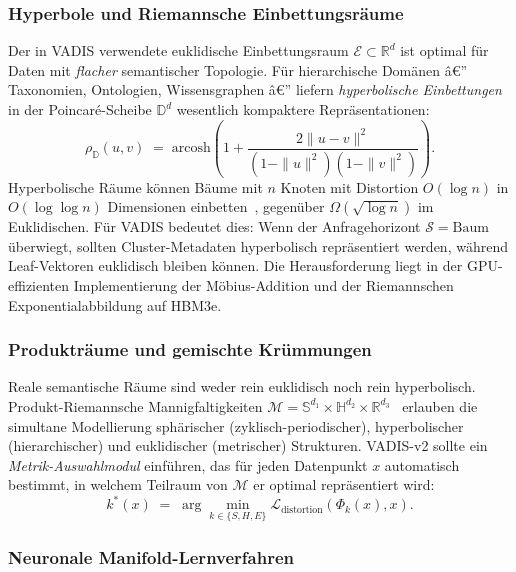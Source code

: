 ﻿\documentclass[12pt,a4paper]{article}
\begin{document}
\subsubsection{Hyperbole und Riemannsche Einbettungsräume}

Der in VADIS verwendete euklidische Einbettungsraum
$\mathcal{E} \subset \mathbb{R}^d$ ist optimal für
Daten mit \emph{flacher} semantischer Topologie. Für
hierarchische Domänen â€” Taxonomien, Ontologien, Wissensgraphen
â€” liefern \emph{hyperbolische Einbettungen}~\cite{nickel2017poincare}
in der Poincaré-Scheibe $\mathbb{D}^d$ wesentlich kompaktere
Repräsentationen:
\begin{equation}
  \rho_{\mathbb{D}}(u, v) \;=\; \text{arcosh}\!\left(
    1 + \frac{2\|u - v\|^2}{(1-\|u\|^2)(1-\|v\|^2)}
  \right).
\end{equation}
Hyperbolische Räume können Bäume mit $n$ Knoten
mit Distortion $O(\log n)$ in $O(\log\log n)$
Dimensionen einbetten~\cite{sarkar2011lowdistortion},
gegenüber $\Omega(\sqrt{\log n})$ im Euklidischen.
Für VADIS bedeutet dies: Wenn der Anfragehorizont
$\mathcal{S} = \text{Baum}$ überwiegt, sollten
Cluster-Metadaten hyperbolisch repräsentiert werden,
während Leaf-Vektoren euklidisch bleiben können.
Die Herausforderung liegt in der GPU-effizienten
Implementierung der Möbius-Addition und der
Riemannschen Exponentialabbildung auf HBM3e.

\subsubsection{Produkträume und gemischte Krümmungen}

Reale semantische Räume sind weder rein euklidisch
noch rein hyperbolisch. Produkt-Riemannsche Mannigfaltigkeiten
$\mathcal{M} = \mathbb{S}^{d_1} \times \mathbb{H}^{d_2}
\times \mathbb{R}^{d_3}$~\cite{gu2018learning}
erlauben die simultane Modellierung sphärischer
(zyklisch-periodischer), hyperbolischer (hierarchischer)
und euklidischer (metrischer) Strukturen.
VADIS-v2 sollte ein \emph{Metrik-Auswahlmodul} einführen,
das für jeden Datenpunkt $x$ automatisch bestimmt,
in welchem Teilraum von $\mathcal{M}$ er optimal
repräsentiert wird:
\begin{equation}
  k^*(x) \;=\; \arg\min_{k \in \{S, H, E\}}
    \mathcal{L}_{\text{distortion}}(\Phi_k(x), x).
\end{equation}

\subsubsection{Neuronale Manifold-Lernverfahren}
\end{document}
